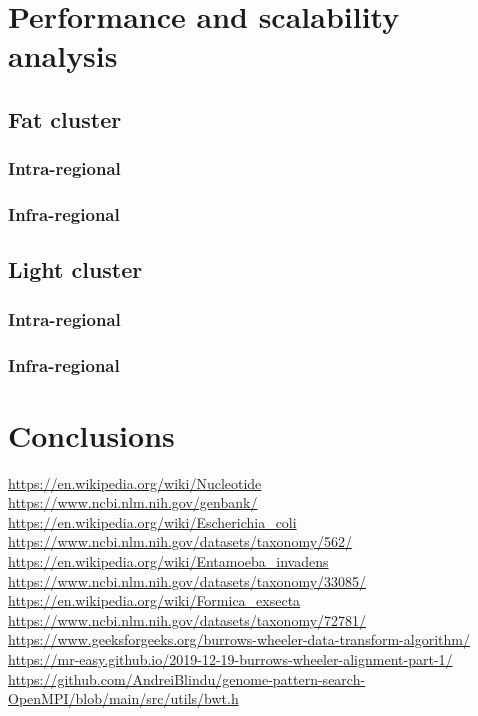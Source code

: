 \documentclass[final,5p,times,twocolumn,authoryear]{elsarticle}
\begin{document}
\section{Performance and scalability analysis}

\subsection{Fat cluster}
\subsubsection{Intra-regional}
\subsubsection{Infra-regional}

\subsection{Light cluster}
\subsubsection{Intra-regional}
\subsubsection{Infra-regional}


\section{Conclusions}

\begin{thebibliography}{9}
 \url{https://en.wikipedia.org/wiki/Nucleotide}
 \url{https://www.ncbi.nlm.nih.gov/genbank/}
 \url{https://en.wikipedia.org/wiki/Escherichia_coli}
 \url{https://www.ncbi.nlm.nih.gov/datasets/taxonomy/562/}
 \url{https://en.wikipedia.org/wiki/Entamoeba_invadens}
 \url{https://www.ncbi.nlm.nih.gov/datasets/taxonomy/33085/}
 \url{https://en.wikipedia.org/wiki/Formica_exsecta}
 \url{https://www.ncbi.nlm.nih.gov/datasets/taxonomy/72781/}
\url{https://www.geeksforgeeks.org/burrows-wheeler-data-transform-algorithm/}
\url{https://mr-easy.github.io/2019-12-19-burrows-wheeler-alignment-part-1/}
\url{https://github.com/AndreiBlindu/genome-pattern-search-OpenMPI/blob/main/src/utils/bwt.h}
\end{thebibliography}
\end{document}
